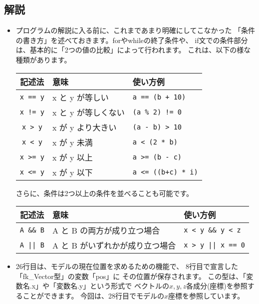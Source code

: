 \subsection*{解説}
\begin{itemize}
 \item プログラムの解説に入る前に、これまであまり明確にしてこなかった
	「条件の書き方」を述べておきます。forやwhileの終了条件や、
	if文での条件部分は、基本的に「2つの値の比較」によって行われます。
	これは、以下の様な種類があります。
	\begin{center}
	\begin{tabular}{|c|l|l|}
	\hline
	記述法 & 意味 & 使い方例 \\ \hline \hline
	\verb+x == y+ & x と y が等しい & \verb-a == (b + 10)- \\ \hline
	\verb+x != y+ & x と y が等しくない & \verb+(a % 2) != 0+ \\ \hline
	\verb+x > y+ & x が y より大きい & \verb+(a - b) > 10+ \\ \hline
	\verb+x < y+ & x が y 未満 & \verb+a < (2 * b)+ \\ \hline
	\verb+x >= y+ & x が y 以上 & \verb+a >= (b - c)+ \\ \hline
	\verb+x <= y+ & x が y 以下 & \verb-a <= ((b+c) * i)- \\ \hline
	\end{tabular}
	\end{center}

	さらに、条件は2つ以上の条件を並べることも可能です。
	\begin{center}
	\begin{tabular}{|c|p{3cm}|l|}
	\hline
	記述法 & 意味 & 使い方例 \\ \hline \hline
	\verb+A && B+ & A と B の両方が成り立つ場合 &
		\verb-x < y && y < z- \\ \hline
	\verb+A || B+ & A と B がいずれかが成り立つ場合 &
		\verb-x > y || x == 0- \\ \hline
	\end{tabular}
	\end{center}

 \item 26行目は、モデルの現在位置を求めるための機能で、
	8行目で宣言した「fk\_Vector型」の変数「pos」に
	その位置が保存されます。
	この型は、「変数名.x」や「変数名.y」という形式で
	ベクトルの\(x,y,z\)各成分(座標)を参照することができます。
	今回は、28行目でモデルの\(x\)座標を参照しています。


\end{itemize}
